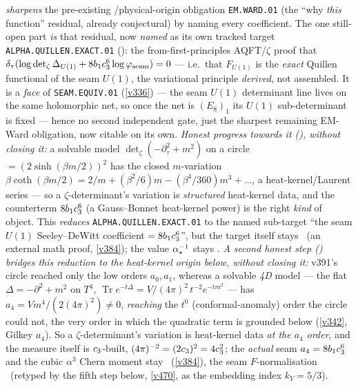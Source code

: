 \emph{sharpens} the pre-existing \mO/physical-origin obligation \texttt{EM.WARD.01} (the ``why \emph{this}
function'' residual, already conjectural) by naming every coefficient. The one still-open part \emph{is} that
residual, now \emph{named} as its own tracked target \texttt{ALPHA.QUILLEN.EXACT.01}
(): the from-first-principles AQFT/$\zeta$ proof that
$\delta_\tau(\log\det\nolimits_\zeta\Delta_{U(1)}+8b_1c_3^6\log\varphi_{\mathrm{seam}})=0$ --- i.e.\ that
$F_{U(1)}$ is the \emph{exact} Quillen functional of the seam $U(1)$, the variational principle \emph{derived}, not
assembled. It is a \emph{face} of \texttt{SEAM.EQUIV.01} (\vref{v336}) --- the seam $U(1)$ determinant line lives on
the same holomorphic net, so once the net is $(E_8)_1$ its $U(1)$ sub-determinant is fixed --- hence no second
independent gate, just the sharpest remaining EM-Ward obligation, now citable on its own.
\emph{Honest progress towards it (), without closing it:} a solvable
model $\det_\zeta(-\partial_\tau^2{+}m^2)$ on a circle $=(2\sinh(\beta m/2))^2$ has the closed $m$-variation
$\beta\coth(\beta m/2)=2/m+(\beta^2/6)m-(\beta^4/360)m^3+\dots$, a heat-kernel/Laurent series --- so a
$\zeta$-determinant's variation is \emph{structured} heat-kernel data, and the counterterm $8b_1c_3^6$ (a
Gauss--Bonnet heat-kernel power) is the right \emph{kind} of object. This \emph{reduces}
\texttt{ALPHA.QUILLEN.EXACT.01} to the named sub-target ``the seam $U(1)$ Seeley--DeWitt coefficient $=8b_1c_3^6$'',
but the target itself stays \mO\ (an external math proof, \vref{v384}); the value $\alpha^{-1}_\star$ stays \mE.
\emph{A second honest step () bridges this reduction to the heat-kernel
origin below, without closing it:} v391's circle reached only the low orders $a_0,a_1$, whereas a solvable \emph{4D}
model --- the flat $\Delta=-\partial^2{+}m^2$ on $T^4$, $\operatorname{Tr}e^{-t\Delta}=V/(4\pi)^2\,t^{-2}e^{-tm^2}$
--- has $a_4=Vm^4/(2(4\pi)^2)\neq0$, \emph{reaching} the $t^0$ (conformal-anomaly) order the circle could not, the
very order in which the quadratic term is grounded below (\vref{v342}, Gilkey $a_4$). So a $\zeta$-determinant's
variation is heat-kernel data \emph{at the $a_4$ order}, and the measure itself is $c_3$-built,
$(4\pi)^{-2}=(2c_3)^2=4c_3^2$; the \emph{actual} seam $a_4=8b_1c_3^6$ and the cubic $\alpha^3$ Chern
moment stay \mO\ (\vref{v384}), the seam $F$-normalisation \mC\ (retyped by the fifth step below,
\vref{v470}, as the embedding index $k_Y{=}5/3$).
